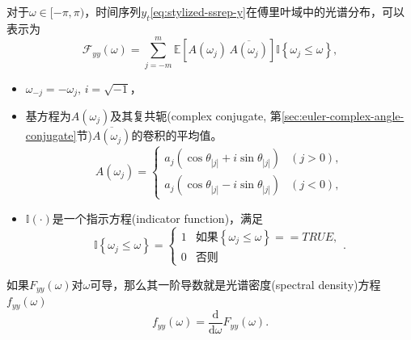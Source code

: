 对于$\omega \in [ - \pi, \pi )$，时间序列$y_{t}$\eqref{eq:stylized-ssrep-y}在傅里叶域中的光谱分布，可以表示为
\begin{equation}
  \label{sec:stylized-ssrep-fourier-y}
  \mathcal{F}_{yy} \left( \omega \right) = \sum_{j=-m}^{m}
  \mathbb{E} \left[ A \left( \omega_{j} \right) \,
  \overline{
  A \left( \omega_{j} \right)
  }
  \right]
  \mathbb{I} \left\{ \omega_{j} \le \omega \right\},
\end{equation}
\begin{itemize}
  \item $\omega_{-j} = - \omega_{j}, \, i=\sqrt{-1}$，
  \item 基方程为$A \left(\omega_{j} \right)$及其复共轭(complex conjugate, 第\ref{sec:euler-complex-angle-conjugate}节)$\overline{A \left( \omega_{j} \right)}$的卷积的平均值。
  \begin{equation*}
    A \left( \omega_{j} \right) =
    \begin{cases}
      a_{j} \left( \cos \theta_{\left| j \right|} + i \sin \theta_{\left| j \right|} \right) & (j > 0), \\
      a_{j} \left( \cos \theta_{\left| j \right|} - i \sin \theta_{\left| j \right|} \right) & (j < 0),
    \end{cases}
  \end{equation*}
  \item $ \mathbb{I}(\cdot)$是一个指示方程(indicator function)，满足
  \begin{equation}
    \label{eq:euler-complex-indicator-function-def}
    \mathbb{I} \left\{ \omega_{j} \le \omega \right\}
    = \begin{cases}
    1 & \text{如果}\left\{\omega_{j} \le \omega \right\} == TRUE, \\
    0 & \text{否则}
    \end{cases}.
  \end{equation}
\end{itemize}

如果$F_{yy} \left( \omega \right)$对$\omega$可导，那么其一阶导数就是光谱密度(spectral density)方程$f_{yy} \left( \omega \right)$
\begin{equation}
  \label{eq:ssrep-spectral-density-function}
  f_{yy} \left( \omega \right) = \frac{\mathrm{d}}{\mathrm{d} \omega} F_{yy} \left( \omega \right).
\end{equation}

